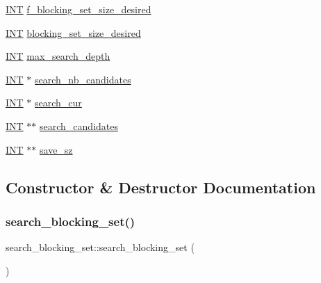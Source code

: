 \begin{DoxyCompactItemize}
\item 
\mbox{\hyperlink{galois_8h_a09fddde158a3a20bd2dcadb609de11dc}{I\+NT}} \mbox{\hyperlink{classsearch__blocking__set_a910d7923a2f95b63b58eb3f9583be10f}{f\+\_\+blocking\+\_\+set\+\_\+size\+\_\+desired}}
\item 
\mbox{\hyperlink{galois_8h_a09fddde158a3a20bd2dcadb609de11dc}{I\+NT}} \mbox{\hyperlink{classsearch__blocking__set_a06bff4a14ece669ddc0436e9cb669518}{blocking\+\_\+set\+\_\+size\+\_\+desired}}
\item 
\mbox{\hyperlink{galois_8h_a09fddde158a3a20bd2dcadb609de11dc}{I\+NT}} \mbox{\hyperlink{classsearch__blocking__set_a26963e97e5cccdbe0c481c9f68c14816}{max\+\_\+search\+\_\+depth}}
\item 
\mbox{\hyperlink{galois_8h_a09fddde158a3a20bd2dcadb609de11dc}{I\+NT}} $\ast$ \mbox{\hyperlink{classsearch__blocking__set_ab6b6124fd3145e9c8455bc9857022487}{search\+\_\+nb\+\_\+candidates}}
\item 
\mbox{\hyperlink{galois_8h_a09fddde158a3a20bd2dcadb609de11dc}{I\+NT}} $\ast$ \mbox{\hyperlink{classsearch__blocking__set_af954ba3fdde96c2f21ad24a43c6b6795}{search\+\_\+cur}}
\item 
\mbox{\hyperlink{galois_8h_a09fddde158a3a20bd2dcadb609de11dc}{I\+NT}} $\ast$$\ast$ \mbox{\hyperlink{classsearch__blocking__set_a0e5e7f290834817d48b029b2684bee79}{search\+\_\+candidates}}
\item 
\mbox{\hyperlink{galois_8h_a09fddde158a3a20bd2dcadb609de11dc}{I\+NT}} $\ast$$\ast$ \mbox{\hyperlink{classsearch__blocking__set_ace59f1c412c7c3a2e855c487bfcfb9b1}{save\+\_\+sz}}
\end{DoxyCompactItemize}


\subsection{Constructor \& Destructor Documentation}
\mbox{\label{classsearch__blocking__set_a6076edc87a45e46e63906c624e16f71d}} 
\subsubsection{\texorpdfstring{search\+\_\+blocking\+\_\+set()}{search\_blocking\_set()}}
{\footnotesize\ttfamily search\+\_\+blocking\+\_\+set\+::search\+\_\+blocking\+\_\+set (\begin{DoxyParamCaption}{ }\end{DoxyParamCaption})}

